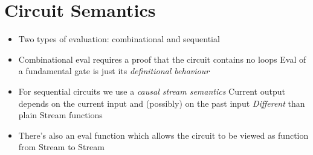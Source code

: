     \section{Circuit Semantics}
    \label{sec:circuit-semantics}
        \begin{itemize}
            \item Two types of evaluation: combinational and sequential
            \item Combinational eval requires a proof that the circuit contains no loops
                \subitem Eval of a fundamental gate is just its \emph{definitional behaviour}

            \item For sequential circuits we use a \emph{causal stream semantics}
                \subitem Current output depends on the current input and (possibly) on the past input
                \subitem \emph{Different} than plain Stream functions

            \item There's also an eval function which allows the circuit to be viewed as function from Stream to Stream
        \end{itemize}
